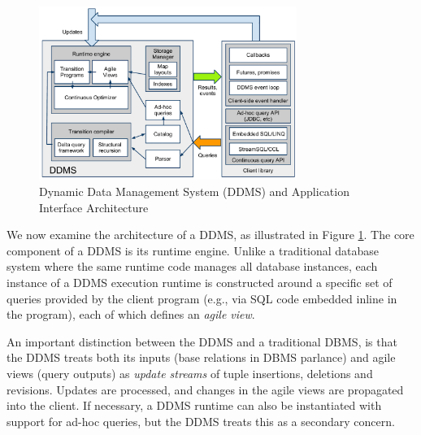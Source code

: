 
\begin{figure}
\begin{center}
\includegraphics[width=3.3in]{graphics/CIDRarch.pdf}
\end{center}
\vspace*{-0.2in}
\caption{Dynamic Data Management System (DDMS) and Application Interface
Architecture}
\label{fig:ddmsarch}
\vspace*{-0.2in}
\end{figure}

We now examine the architecture of a DDMS, as illustrated in Figure
\ref{fig:ddmsarch}.  The core component of a DDMS is its runtime engine.  Unlike
a traditional database system where the same runtime code manages all database
instances, each instance of a DDMS execution runtime is constructed around a
specific set of queries provided by the client program (e.g., via SQL code
embedded inline in the program), each of which defines an \textit{agile view}.


An important distinction between the DDMS and a traditional DBMS, is that the
DDMS treats both its inputs (base relations in DBMS parlance) and agile views
(query outputs) as \textit{update streams} of tuple insertions, deletions and
revisions.  Updates are processed, and changes in the agile views are propagated
into the client.  If necessary, a DDMS runtime can also be instantiated with
support for ad-hoc queries, but the DDMS treats this as a secondary concern.


